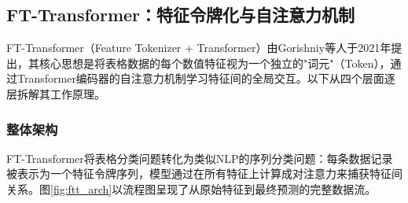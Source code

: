 
\subsection{FT-Transformer：特征令牌化与自注意力机制}

FT-Transformer（Feature Tokenizer + Transformer）由Gorishniy等人\cite{gorishniy2021revisiting}于2021年提出，其核心思想是将表格数据的每个数值特征视为一个独立的"词元"（Token），通过Transformer编码器的自注意力机制学习特征间的全局交互。以下从四个层面逐层拆解其工作原理。

\subsubsection{整体架构}

FT-Transformer将表格分类问题转化为类似NLP的序列分类问题：每条数据记录被表示为一个特征令牌序列，模型通过在所有特征上计算成对注意力来捕获特征间关系。图\ref{fig:ftt_arch}以流程图呈现了从原始特征到最终预测的完整数据流。


